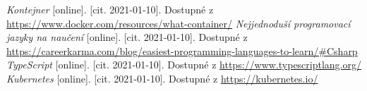 \begin{thebibliography}{99}
     \textit{Kontejner} [online]. [cit. 2021-01-10]. Dostupné z \url{https://www.docker.com/resources/what-container/}
     \textit{Nejjednoduší programovací jazyky na naučení} [online]. [cit. 2021-01-10]. Dostupné z \url{https://careerkarma.com/blog/easiest-programming-languages-to-learn/#Csharp}
     \textit{TypeScript} [online]. [cit. 2021-01-10]. Dostupné z \url{https://www.typescriptlang.org/}
     \textit{Kubernetes} [online]. [cit. 2021-01-10]. Dostupné z \url{https://kubernetes.io/}
\end{thebibliography}



